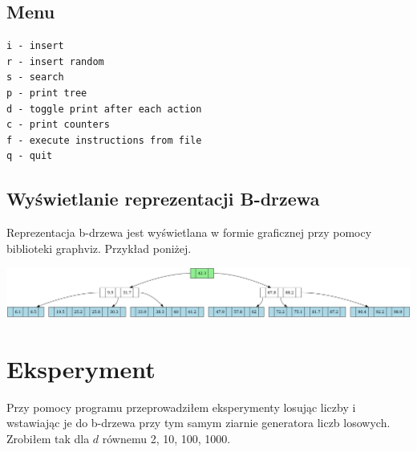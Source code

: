 \documentclass{article}
\begin{document}
\subsection{Menu}
\begin{lstlisting}
i - insert
r - insert random
s - search
p - print tree
d - toggle print after each action
c - print counters
f - execute instructions from file
q - quit
\end{lstlisting}

\subsection{Wyświetlanie reprezentacji B-drzewa}
Reprezentacja b-drzewa jest wyświetlana w formie graficznej przy pomocy biblioteki graphviz. Przykład poniżej.
\begin{center}
\includegraphics[width=1\textwidth]{images/bdrzewo-przyklad.png}    
\end{center}

\section{Eksperyment}
Przy pomocy programu przeprowadziłem eksperymenty losując liczby i wstawiając je do b-drzewa przy tym samym ziarnie generatora liczb losowych. Zrobiłem tak dla $d$ równemu 2, 10, 100, 1000.
\end{document}
